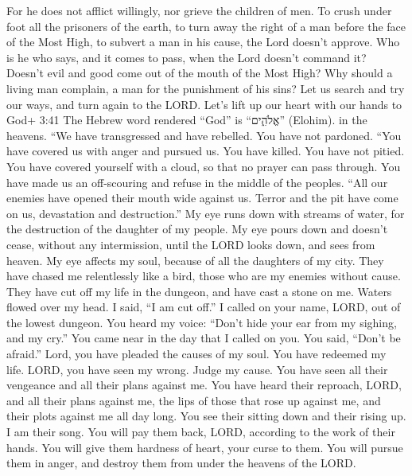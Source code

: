  For he does not afflict willingly, nor grieve the children
of men.  To crush under foot all the prisoners of the
earth,  to turn away the right of a man before the face of
the Most High,  to subvert a man in his cause, the Lord
doesn't approve.  Who is he who says, and it comes to pass,
when the Lord doesn't command it?  Doesn't evil and good
come out of the mouth of the Most High?  Why should a
living man complain, a man for the punishment of his sins? 
Let us search and try our ways, and turn again to the LORD.
 Let's lift up our heart with our hands to God+ 3:41 The
Hebrew word rendered ``God'' is ``אֱלֹהִ֑ים'' (Elohim). in the heavens.
 ``We have transgressed and have rebelled. You have not
pardoned.  ``You have covered us with anger and pursued us.
You have killed. You have not pitied.  You have covered
yourself with a cloud, so that no prayer can pass through. 
You have made us an off-scouring and refuse in the middle of the
peoples.  ``All our enemies have opened their mouth wide
against us.  Terror and the pit have come on us,
devastation and destruction.''  My eye runs down with
streams of water, for the destruction of the daughter of my people.
 My eye pours down and doesn't cease, without any
intermission,  until the LORD looks down, and sees from
heaven.  My eye affects my soul, because of all the
daughters of my city.  They have chased me relentlessly
like a bird, those who are my enemies without cause.  They
have cut off my life in the dungeon, and have cast a stone on me.
 Waters flowed over my head. I said, ``I am cut off.''
 I called on your name, LORD, out of the lowest dungeon.
 You heard my voice: ``Don't hide your ear from my sighing,
and my cry.''  You came near in the day that I called on
you. You said, ``Don't be afraid.''  Lord, you have pleaded
the causes of my soul. You have redeemed my life.  LORD,
you have seen my wrong. Judge my cause.  You have seen all
their vengeance and all their plans against me.  You have
heard their reproach, LORD, and all their plans against me,
 the lips of those that rose up against me, and their plots
against me all day long.  You see their sitting down and
their rising up. I am their song.  You will pay them back,
LORD, according to the work of their hands.  You will give
them hardness of heart, your curse to them.  You will
pursue them in anger, and destroy them from under the heavens of the
LORD.

